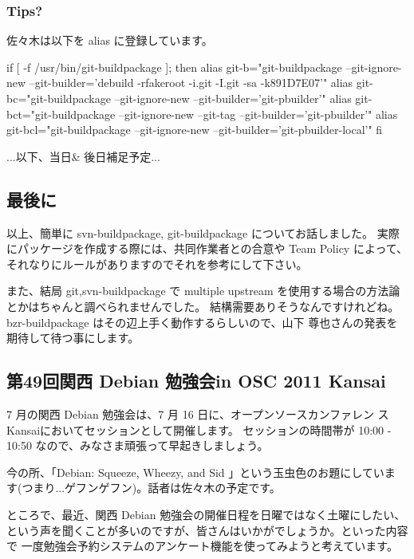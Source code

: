 \documentclass[mingoth,a4paper]{jsarticle}
\begin{document}
\subsubsection{Tips?}
佐々木は以下を alias に登録しています。
\begin{commandline}
if [ -f /usr/bin/git-buildpackage ]; then
  alias git-b="git-buildpackage --git-ignore-new --git-builder='debuild -rfakeroot -i.git -I.git -sa -k891D7E07'"
  alias git-bc="git-buildpackage --git-ignore-new --git-builder='git-pbuilder'"
  alias git-bct="git-buildpackage --git-ignore-new --git-tag --git-builder='git-pbuilder'"
  alias git-bcl="git-buildpackage --git-ignore-new --git-builder='git-pbuilder-local'"
fi
\end{commandline}

...以下、当日\& 後日補足予定...

\subsection{最後に}

以上、簡単に svn-buildpackage, git-buildpackage についてお話しました。
実際にパッケージを作成する際には、共同作業者との合意や Team Policy によって、それなりにルールがありますのでそれを参考にして下さい。

また、結局 {git,svn}-buildpackage で multiple upstream を使用する場合の方法論とかはちゃんと調べられませんでした。
結構需要ありそうなんですけれどね。bzr-buildpackage はその辺上手く動作するらしいので、山下 尊也さんの発表を期待して待つ事にします。

\clearpage

\subsection{第49回関西 Debian 勉強会in OSC 2011 Kansai\@Kyoto }

7 月の関西 Debian 勉強会は、7 月 16 日に、オープンソースカンファレン
ス Kansai\@Kyoto においてセッションとして開催します。
セッションの時間帯が 10:00 - 10:50 なので、みなさま頑張って早起きしましょう。

今の所、「Debian: Squeeze, Wheezy, and Sid 」という玉虫色のお題にしていま
す(つまり...ゲフンゲフン)。話者は佐々木の予定です。

ところで、最近、関西 Debian 勉強会の開催日程を日曜ではなく土曜にしたい、
という声を聞くことが多いのですが、皆さんはいかがでしょうか。といった内容で
一度勉強会予約システムのアンケート機能を使ってみようと考えています。
\end{document}
